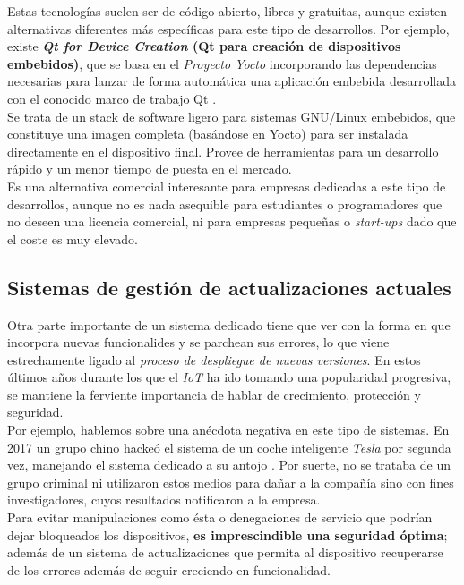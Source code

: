 Estas tecnologías suelen ser de código abierto, libres y gratuitas, aunque existen alternativas diferentes más específicas para este tipo de desarrollos. Por ejemplo, existe \textbf{\textit{Qt for Device Creation} (Qt para creación de dispositivos embebidos)}, que se basa en el \textit{Proyecto Yocto} incorporando las dependencias necesarias para lanzar de forma automática una aplicación embebida desarrollada con el conocido marco de trabajo Qt \cite{qt-device-creation}.\\

Se trata de un stack de software ligero para sistemas GNU/Linux embebidos, que constituye una imagen completa (basándose en Yocto) para ser instalada directamente en el dispositivo final. Provee de herramientas para un desarrollo rápido y un menor tiempo de puesta en el mercado.\\

Es una alternativa comercial interesante para empresas dedicadas a este tipo de desarrollos, aunque no es nada asequible para estudiantes o programadores que no deseen una licencia comercial, ni para empresas pequeñas o \textit{start-ups} dado que el coste es muy elevado.\\

\subsection{Sistemas de gestión de actualizaciones actuales}

Otra parte importante de un sistema dedicado tiene que ver con la forma en que incorpora nuevas funcionalides y se parchean sus errores, lo que viene estrechamente ligado al \textit{proceso de despliegue de nuevas versiones}. En estos últimos años durante los que el \textit{IoT} ha ido tomando una popularidad progresiva, se mantiene la ferviente importancia de hablar de crecimiento, protección y seguridad.\\

Por ejemplo, hablemos sobre una anécdota negativa en este tipo de sistemas. En 2017 un grupo chino hackeó el sistema de un coche inteligente \textit{Tesla} por segunda vez, manejando el sistema dedicado a su antojo \cite{tesla-system-hacked}. Por suerte, no se trataba de un grupo criminal ni utilizaron estos medios para dañar a la compañía sino con fines investigadores, cuyos resultados notificaron a la empresa.\\

Para evitar manipulaciones como ésta o denegaciones de servicio que podrían dejar bloqueados los dispositivos, \textbf{es imprescindible una seguridad óptima}; además de un sistema de actualizaciones que permita al dispositivo recuperarse de los errores además de seguir creciendo en funcionalidad.\\

